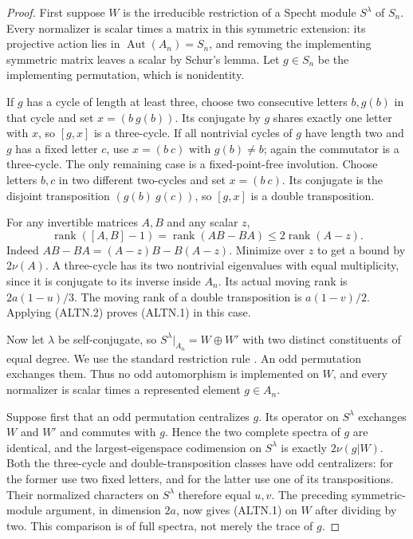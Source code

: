 \begin{proof}
First suppose $W$ is the irreducible restriction of a Specht
module $S^\lambda$ of $S_n$. Every normalizer is scalar times
a matrix in this symmetric extension: its projective action lies
in $\operatorname{Aut}(A_n)=S_n$, and removing the implementing
symmetric matrix leaves a scalar by Schur's lemma. Let $g\in S_n$
be the implementing permutation, which is nonidentity.

If $g$ has a cycle of length at least three, choose two consecutive
letters $b,g(b)$ in that cycle and set $x=(b\ g(b))$. Its conjugate
by $g$ shares exactly one letter with $x$, so $[g,x]$ is a
three-cycle. If all nontrivial cycles of $g$ have length two and
$g$ has a fixed letter $c$, use $x=(b\ c)$ with $g(b)\ne b$;
again the commutator is a three-cycle. The only remaining case
is a fixed-point-free involution. Choose letters $b,c$ in two
different two-cycles and set $x=(b\ c)$. Its conjugate is the
disjoint transposition $(g(b)\ g(c))$, so $[g,x]$ is a double
transposition.

For any invertible matrices $A,B$ and any scalar $z$,
\[
 \operatorname{rank}([A,B]-1)
 =\operatorname{rank}(AB-BA)
 \le2\operatorname{rank}(A-z).
                                                               \tag{ALTN.2}
\]
Indeed $AB-BA=(A-z)B-B(A-z)$. Minimize over $z$ to get a bound
by $2\nu(A)$. A three-cycle has its two nontrivial eigenvalues
with equal multiplicity, since it is conjugate to its inverse
inside $A_n$. Its actual moving rank is $2a(1-u)/3$.
The moving rank of a double transposition is $a(1-v)/2$.
Applying (ALTN.2) proves (ALTN.1) in this case.

Now let $\lambda$ be self-conjugate, so
$S^\lambda|_{A_n}=W\oplus W'$ with two distinct constituents
of equal degree. We use the standard restriction rule
\cite[\S2A, p.~604]{HD:BNOT2015}. An odd permutation exchanges
them. Thus no odd automorphism is implemented on $W$, and every
normalizer is scalar times a represented element $g\in A_n$.

Suppose first that an odd permutation centralizes $g$. Its
operator on $S^\lambda$ exchanges $W$ and $W'$ and commutes
with $g$. Hence the two complete spectra of $g$ are identical,
and the largest-eigenspace codimension on $S^\lambda$ is
exactly $2\nu(g|W)$. Both the three-cycle and double-transposition
classes have odd centralizers: for the former use two fixed
letters, and for the latter use one of its transpositions.
Their normalized characters on $S^\lambda$ therefore equal
$u,v$. The preceding symmetric-module argument, in dimension
$2a$, now gives (ALTN.1) on $W$ after dividing by two.
This comparison is of full spectra, not merely the trace of $g$.


\end{proof}
